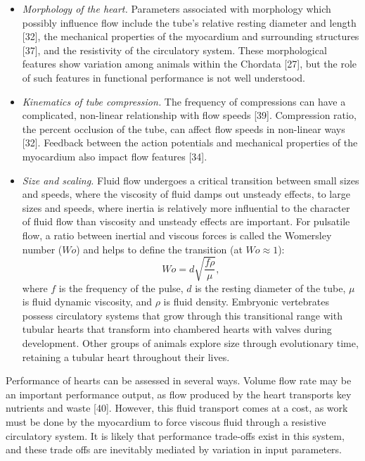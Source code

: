 \documentclass[
]{article}
\providecommand{\tightlist}{%
  \setlength{\itemsep}{0pt}\setlength{\parskip}{0pt}}
\begin{document}
\begin{itemize}
\tightlist
\item
  \emph{Morphology of the heart.} Parameters associated with morphology
  which possibly influence flow include the tube's relative resting
  diameter and length {[}32{]}, the mechanical properties of the
  myocardium and surrounding structures {[}37{]}, and the resistivity of
  the circulatory system. These morphological features show variation
  among animals within the Chordata {[}27{]}, but the role of such
  features in functional performance is not well understood.
\item
  \emph{Kinematics of tube compression.} The frequency of compressions
  can have a complicated, non-linear relationship with flow speeds
  {[}39{]}. Compression ratio, the percent occlusion of the tube, can
  affect flow speeds in non-linear ways {[}32{]}. Feedback between the
  action potentials and mechanical properties of the myocardium also
  impact flow features {[}34{]}.
\item
  \emph{Size and scaling.} Fluid flow undergoes a critical transition
  between small sizes and speeds, where the viscosity of fluid damps out
  unsteady effects, to large sizes and speeds, where inertia is
  relatively more influential to the character of fluid flow than
  viscosity and unsteady effects are important. For pulsatile flow, a
  ratio between inertial and viscous forces is called the Womersley
  number (\(Wo\)) and helps to define the transition (at
  \(Wo\approx1\)): \begin{equation}
  Wo = d\sqrt{\frac{f \rho}{\mu}},
  \label{Wo}
  \end{equation} where \(f\) is the frequency of the pulse, \(d\) is the
  resting diameter of the tube, \(\mu\) is fluid dynamic viscosity, and
  \(\rho\) is fluid density. Embryonic vertebrates possess circulatory
  systems that grow through this transitional range with tubular hearts
  that transform into chambered hearts with valves during development.
  Other groups of animals explore size through evolutionary time,
  retaining a tubular heart throughout their lives.
\end{itemize}

Performance of hearts can be assessed in several ways. Volume flow rate
may be an important performance output, as flow produced by the heart
transports key nutrients and waste {[}40{]}. However, this fluid
transport comes at a cost, as work must be done by the myocardium to
force viscous fluid through a resistive circulatory system. It is likely
that performance trade-offs exist in this system, and these trade offs
are inevitably mediated by variation in input parameters.
\end{document}
